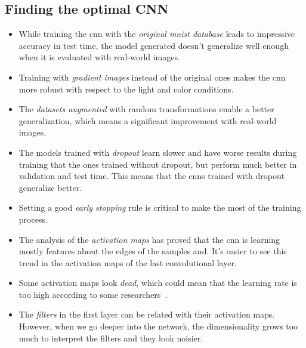 \subsection*{Finding the optimal CNN}
\begin{itemize}
	\item While training the \gls{cnn} with the \emph{original \gls{mnist} database} leads to impressive accuracy in test time, the model generated doesn't generalize well enough when it is evaluated with real-world images.
	\item Training with \emph{gradient images} instead of the original ones makes the \gls{cnn} more robust with respect to the light and color conditions.
	\item The \emph{datasets augmented} with random transformations enable a better generalization, which means a significant improvement with real-world images.
	\item The models trained with \emph{dropout} learn slower and have worse results during training that the ones trained without dropout, but perform much better in validation and test time. This means that the \glspl{cnn} trained with dropout generalize better. 
	\item Setting a good \emph{early stopping} rule is critical to make the most of the training process. 
	\item The analysis of the \emph{activation maps} has proved that the \gls{cnn} is learning mostly features about the edges of the samples and. It's easier to see this trend in the activation maps of the last convolutional layer.
	\item Some activation maps look \textit{dead}, which could mean that the learning rate is too high according to some researchers~\cite{cs231n}.
	\item The \emph{filters} in the first layer can be related with their activation maps. However, when we go deeper into the network, the dimensionality grows too much to interpret the filters and they look noisier. 
\end{itemize}


